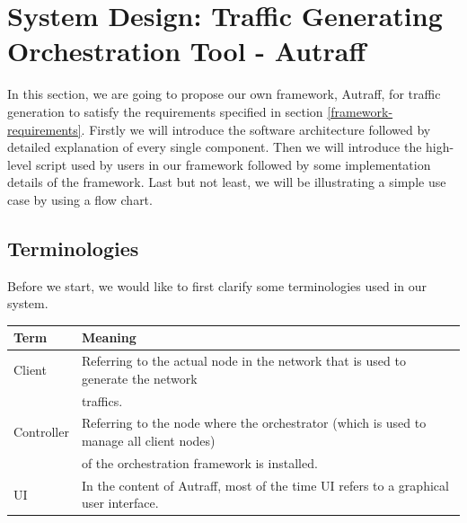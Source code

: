 \documentclass[12pt]{report}
\begin{document}
\chapter{System Design: Traffic Generating Orchestration Tool - Autraff} \label{sd}

In this section, we are going to propose our own framework, Autraff, for traffic generation to satisfy the requirements specified in section \ref{framework-requirements}. Firstly we will introduce the software architecture followed by detailed explanation of every single component. Then we will introduce the high-level script used by users in our framework followed by some implementation details of the framework. Last but not least, we will be illustrating a simple use case by using a flow chart.

\section{Terminologies}
Before we start, we would like to first clarify some terminologies used in our system.\\

\setlength{\parindent}{0pt}
\begin{tabular}{ | l | l |}
\hline
\textbf{Term} & \textbf{Meaning} \\
\hline
Client & Referring to the actual node in the network that is used to generate the network \\ & traffics. \\
\hline
Controller & Referring to the node where the orchestrator (which is used to manage all client nodes) \\ &  of the orchestration framework is installed. \\
\hline
UI & In the content of Autraff, most of the time UI refers to a graphical user interface. \\
\hline

\end{tabular}
\end{document}
